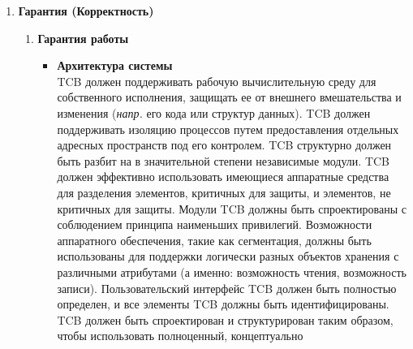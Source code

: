 \begin{enumerate}
\begin{enumerate}
\begin{enumerate}
\begin{enumerate}
                вводящих объект в адресное пространство пользователя и удаляющих объект, запись в журнале аудита должна содержать имя объекта и его уровень конфиденциальности. Администратор
                системы должен иметь возможность выборочного аудита действия любого одного или нескольких пользователей системы на основе индивидуальной идентификации и/или уровне конфиденциальности объекта.
                TCB должен иметь возможность аудита событий для выявления использования скрытых каналов связи. TCB должен содержать механизм, способный отслеживать возникновение или накопление
                проверяемых событий безопасности, которые могут указывать на предполагаемое нарушение политики безопасности. Этот механизм должен немедленно уведомить администратора безопасности
                о превышении пороговых значений, и если возникновение или накопление этих событий, имеющих отношение к безопасности, продолжается, система должна предпринять наименее
                разрушительное действие для прекращения возникновения событий.
            \end{enumerate}
            \item{\textbf{Гарантия (Корректность)}}
            \begin{enumerate}
            \item{\textbf{Гарантия работы}}
                \begin{itemize}
                    \item{\textbf{Архитектура системы}}\\
                    TCB должен поддерживать рабочую вычислительную среду для собственного исполнения, защищать ее от внешнего вмешательства и изменения  (\textit{напр.} его кода или структур данных).
                    TCB должен поддерживать изоляцию процессов путем предоставления отдельных адресных пространств под его контролем. TCB структурно должен быть разбит на в значительной степени
                    независимые модули. TCB должен эффективно использовать имеющиеся аппаратные средства для разделения элементов, критичных для защиты, и элементов, не критичных для защиты.
                    Модули TCB должны быть спроектированы с соблюдением принципа наименьших привилегий. Возможности аппаратного обеспечения, такие как сегментация, должны быть использованы
                    для поддержки логически разных объектов хранения с различными атрибутами (а именно: возможность чтения, возможность записи). Пользовательский интерфейс TCB должен быть полностью
                    определен, и все элементы TCB должны быть идентифицированы. TCB должен быть спроектирован и структурирован таким образом, чтобы использовать полноценный, концептуально

\end{itemize}
\end{enumerate}
\end{enumerate}
\end{enumerate}
\end{enumerate}
